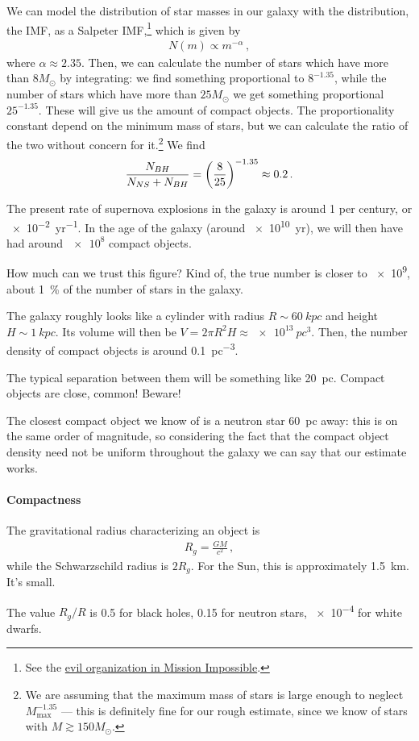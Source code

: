 \documentclass[main.tex]{subfiles}
\begin{document}
We can model the distribution of star masses in our galaxy with the distribution, the IMF, as a Salpeter IMF,\footnote{See the \href{https://missionimpossible.fandom.com/wiki/Impossible_Mission_Force}{evil organization in Mission Impossible}.} which is given by 
%
\begin{align}
N(m) \propto m^{-\alpha }
\,,
\end{align}
%
where \(\alpha \approx \num{2.35}\). Then, we can calculate the number of stars which have more than \(8 M_{\odot}\) by integrating: we find something proportional to \(8^{-1.35}\), while the number of stars which have more than \(25 M_{\odot}\) we get something proportional \(25^{-1.35}\). These will give us the amount of compact objects.
The proportionality constant depend on the minimum mass of stars, but we can calculate the ratio of the two without concern for it.\footnote{We are assuming that the maximum mass of stars is large enough to neglect \(M _{\text{max}}^{-1.35}\) --- this is definitely fine for our rough estimate, since we know of stars with \(M \gtrsim 150 M_{\odot}\).} We find 
%
\begin{align}
\frac{N_{BH}}{N_{NS} + N_{BH}} = \qty(\frac{8}{25})^{-1.35} \approx \num{.2}
\,.
\end{align}

The present rate of supernova explosions in the galaxy is around 1 per century, or \SI{e-2}{yr^{-1}}. 
In the age of the galaxy (around \SI{e10}{yr}), we will then have had around \(\num{e8}\) compact objects. 

How much can we trust this figure? Kind of, the true number is closer to \num{e9}, about \SI{1}{\percent} of the number of stars in the galaxy.

The galaxy roughly looks like a cylinder with radius \(R \sim \SI{60}{kpc}\) and height \(H \sim \SI{1}{kpc}\).
Its volume will then be \(V = 2 \pi R^2 H \approx \SI{e13}{pc^{3}}\). Then, the number density of compact objects is around \SI{0.1}{pc^{-3}}.

The typical separation between them will be something like \SI{20}{pc}. Compact objects are close, common! Beware!

The closest compact object we know of is a neutron star \SI{60}{pc} away: this is on the same order of magnitude, so considering the fact that the compact object density need not be uniform throughout the galaxy we can say that our estimate works.

\paragraph{Compactness}
The gravitational radius characterizing an object is 
%
\begin{align}
R_g = \frac{GM}{c^2}
\,,
\end{align}
%
while the Schwarzschild radius is \(2 R_g\). For the Sun, this is approximately \SI{1.5}{km}. It's small.

The value \(R_g / R\) is \num{.5} for black holes, \num{.15} for neutron stars, \num{e-4} for white dwarfs.
\end{document}

